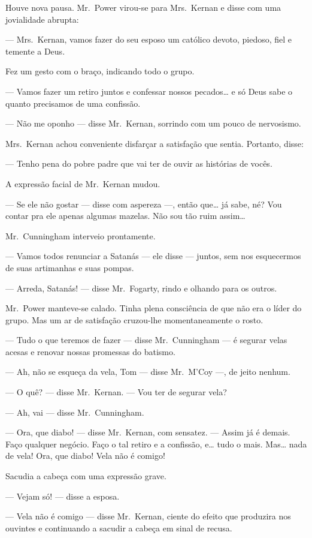 Houve nova pausa.  Mr.~Power virou-se para Mrs.~Kernan e disse com uma
jovialidade abrupta:

--- Mrs.~Kernan, vamos fazer do seu esposo um católico devoto, piedoso, fiel e
temente a Deus.

Fez um gesto com o braço, indicando todo o grupo.

--- Vamos fazer um retiro juntos e confessar nossos pecados\ldots{} e só Deus
sabe o quanto precisamos de uma confissão.

--- Não me oponho --- disse Mr.~Kernan, sorrindo com um pouco de nervosismo.

Mrs.~Kernan achou conveniente disfarçar a satisfação que sentia.  Portanto,
disse:

--- Tenho pena do pobre padre que vai ter de ouvir as histórias de vocês.

A expressão facial de Mr.~Kernan mudou.

--- Se ele não gostar --- disse com aspereza ---, então que\ldots{} já sabe,
né?  Vou contar pra ele apenas algumas mazelas.  Não sou tão ruim assim\ldots{}

Mr.~Cunningham interveio prontamente.

--- Vamos todos renunciar a Satanás --- ele disse --- juntos, sem nos
esquecermos de suas artimanhas e suas pompas.

--- Arreda, Satanás! --- disse Mr.~Fogarty, rindo e olhando para os outros.

Mr.~Power manteve-se calado.  Tinha plena consciência de que não era o líder do
grupo.  Mas um ar de satisfação cruzou-lhe momentaneamente o rosto.

--- Tudo o que teremos de fazer --- disse Mr.~Cunningham --- é segurar velas
acesas e renovar nossas promessas do batismo.

--- Ah, não se esqueça da vela, Tom --- disse Mr.~M’Coy ---, de jeito nenhum.

--- O quê? --- disse Mr.~Kernan.  --- Vou ter de segurar vela?

--- Ah, vai --- disse Mr.~Cunningham.

--- Ora, que diabo! --- disse Mr.~Kernan, com sensatez.  --- Assim já é demais.
Faço qualquer negócio.  Faço o tal retiro e a confissão, e\ldots{} tudo o mais.
Mas\ldots{} nada de vela!  Ora, que diabo!  Vela não é comigo!

Sacudia a cabeça com uma expressão grave.

--- Vejam só! --- disse a esposa.

--- Vela não é comigo --- disse Mr.~Kernan, ciente do efeito que produzira nos
ouvintes e continuando a sacudir a cabeça em sinal de recusa.

